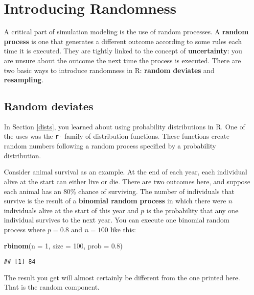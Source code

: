 \documentclass[]{book}
\newenvironment{Shaded}{\begin{snugshade}}{\end{snugshade}}
\newcommand{\KeywordTok}[1]{\textcolor[rgb]{0.13,0.29,0.53}{\textbf{#1}}}
\newcommand{\DataTypeTok}[1]{\textcolor[rgb]{0.13,0.29,0.53}{#1}}
\newcommand{\DecValTok}[1]{\textcolor[rgb]{0.00,0.00,0.81}{#1}}
\newcommand{\FloatTok}[1]{\textcolor[rgb]{0.00,0.00,0.81}{#1}}
\newcommand{\NormalTok}[1]{#1}
\theoremstyle{definition}
\theoremstyle{definition}
\theoremstyle{definition}
\theoremstyle{remark}
\begin{document}
\section{Introducing Randomness}\label{randomness}

A critical part of simulation modeling is the use of random processes. A
\textbf{random process} is one that generates a different outcome
according to some rules each time it is executed. They are tightly
linked to the concept of \textbf{uncertainty}: you are unsure about the
outcome the next time the process is executed. There are two basic ways
to introduce randomness in R: \textbf{random deviates} and
\textbf{resampling}.

\subsection{Random deviates}\label{random-deviates}

In Section \ref{dists}, you learned about using probability
distributions in R. One of the uses was the \texttt{r-} family of
distribution functions. These functions create random numbers following
a random process specified by a probability distribution.

Consider animal survival as an example. At the end of each year, each
individual alive at the start can either live or die. There are two
outcomes here, and suppose each animal has an 80\% chance of surviving.
The number of individuals that survive is the result of a
\textbf{binomial random process} in which there were \(n\) individuals
alive at the start of this year and \(p\) is the probability that any
one individual survives to the next year. You can execute one binomial
random process where \(p = 0.8\) and \(n = 100\) like this:

\begin{Shaded}
\begin{Highlighting}[]
\KeywordTok{rbinom}\NormalTok{(}\DataTypeTok{n =} \DecValTok{1}\NormalTok{, }\DataTypeTok{size =} \DecValTok{100}\NormalTok{, }\DataTypeTok{prob =} \FloatTok{0.8}\NormalTok{)}
\end{Highlighting}
\end{Shaded}

\begin{verbatim}
## [1] 84
\end{verbatim}

The result you get will almost certainly be different from the one
printed here. That is the random component.
\end{document}
